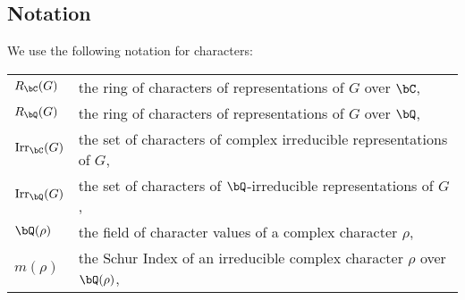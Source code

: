 

\subsection*{Notation}
We use the following notation for characters:

\bigskip

\begin{tabular}{l | l}
    $R_{\bC}(G)$ & the ring of characters of representations of $G$ over $\bC$, \\
    $R_{\bQ}(G)$ & the ring of characters of representations of $G$ over $\bQ$, \\
    $\Irr_\bC(G)$ & the set of characters of complex irreducible representations of $G$, \\
    $\Irr_{\bQ}(G)$ & the set of characters of $\bQ$-irreducible representations of $G$, \\ 
    $\bQ(\rho)$ & the field of character values of a complex character $\rho$, \\
    $m(\rho)$ & the Schur Index of an irreducible complex character $\rho$ over $\bQ(\rho)$, \\
\end{tabular}